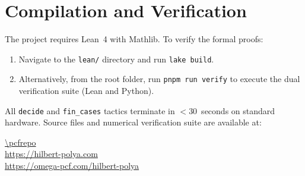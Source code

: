 \section{Compilation and Verification}\label{app:compilation}

The project requires Lean~4 with Mathlib. To verify the formal proofs:
\begin{enumerate}
  \item Navigate to the \texttt{lean/} directory and run \texttt{lake build}.
  \item Alternatively, from the root folder, run \texttt{pnpm run verify} to execute the dual verification suite (Lean and Python).
\end{enumerate}

All \texttt{decide} and \texttt{fin\_cases} tactics terminate in
${}<30$~seconds on standard hardware.
Source files and numerical verification suite are available at:
\begin{center}
  \url{\pcfrepo} \\
  \url{https://hilbert-polya.com} \\
  \url{https://omega-pcf.com/hilbert-polya}
\end{center}
